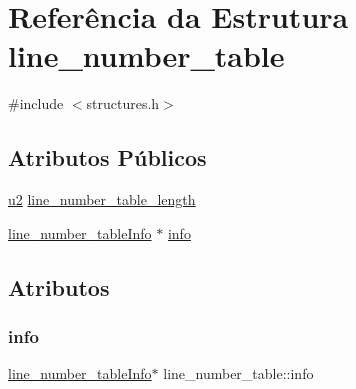 \hypertarget{structline__number__table}{}\section{Referência da Estrutura line\+\_\+number\+\_\+table}
\label{structline__number__table}


{\ttfamily \#include $<$structures.\+h$>$}

\subsection*{Atributos Públicos}
\begin{DoxyCompactItemize}
\item 
\hyperlink{lista__operandos_8h_a732cde1300aafb73b0ea6c2558a7a54f}{u2} \hyperlink{structline__number__table_abe258fd7b751d3d72da9b207afd11beb}{line\+\_\+number\+\_\+table\+\_\+length}
\item 
\hyperlink{structline__number__tableInfo}{line\+\_\+number\+\_\+table\+Info} $\ast$ \hyperlink{structline__number__table_a1d2c6e92d6243f7753d153cc11313ad9}{info}
\end{DoxyCompactItemize}


\subsection{Atributos}
\mbox{\label{structline__number__table_a1d2c6e92d6243f7753d153cc11313ad9}} 
\subsubsection{\texorpdfstring{info}{info}}
{\footnotesize\ttfamily \hyperlink{structline__number__tableInfo}{line\+\_\+number\+\_\+table\+Info}$\ast$ line\+\_\+number\+\_\+table\+::info}

\mbox{\label{structline__number__table_abe258fd7b751d3d72da9b207afd11beb}} 
